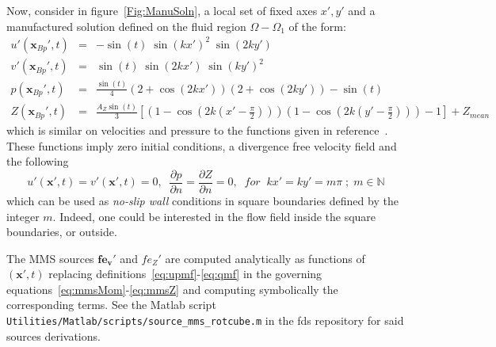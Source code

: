 \documentclass[11pt]{book}
\begin{document}
Now, consider in figure~\ref{Fig:ManuSoln}, a local set of fixed axes $x',y'$ and a manufactured solution defined on the fluid region $\Omega - \Omega_1$ of the form:
%
\begin{eqnarray}
   u'(\mathbf{x}_{Bp}',t) &=& -\sin(t) \; \sin(kx')^2 \; \sin(2ky') \label{eq:upmf} \\
   v'(\mathbf{x}_{Bp}',t) &=&   \sin(t) \; \sin(2kx') \; \sin(ky')^2 \label{eq:vpmf} \\
   p(\mathbf{x}_{Bp}',t) &=& \frac{\sin(t)}{4} \left( 2+\cos(2kx') \right) \left( 2+\cos(2ky') \right) - \sin(t) \label{eq:pmf} \\
   Z(\mathbf{x}_{Bp}',t) &=& \frac{A_Z \sin(t)}{3} \left[ \left( 1-\cos(2k(x'-\frac{\pi}{2})) \right)
                                                                                   \left( 1-\cos(2k(y'-\frac{\pi}{2})) \right) - 1 \right] + Z_{mean} \label{eq:qmf}
\end{eqnarray}
%
which is similar on velocities and pressure to the functions given in reference~\cite{E:CMS2003}.  These functions imply zero initial conditions, a divergence free velocity field and the following
%
\begin{equation}
   u'(\mathbf{x}',t)=v'(\mathbf{x}',t)=0, \; \; \frac{\partial p}{\partial n} = \frac{\partial Z}{\partial n}=0, \; \;
   for \; \; kx'=ky'= m \pi \; ; \; m \in \mathbb{N}
\end{equation}
%
which can be used as \textit{no-slip wall} conditions in square boundaries defined by the integer $m$. Indeed, one could be interested in the flow field inside the square boundaries, or outside.

 The MMS sources $\mathbf{fe_v'}$ and $fe_Z'$ are computed analytically as functions of $(\mathbf{x'},t)$ replacing definitions~\eqref{eq:upmf}-\eqref{eq:qmf} in the governing equations~\eqref{eq:mmsMom}-\eqref{eq:mmsZ} and computing symbolically the corresponding terms. See the Matlab script \texttt{Utilities/Matlab/scripts/source\_mms\_rotcube.m} in the fds repository for said sources derivations.
\end{document}
